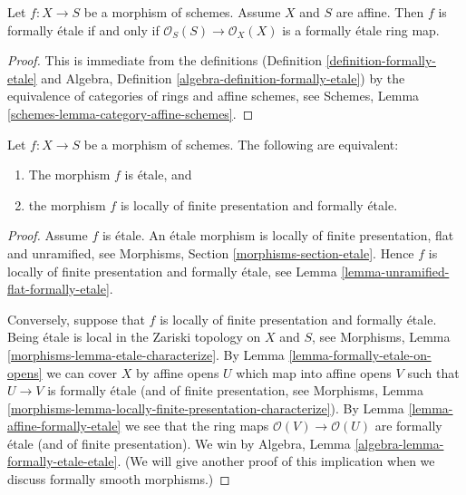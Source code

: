 \begin{lemma}
\label{lemma-affine-formally-etale}
Let $f : X \to S$ be a morphism of schemes.
Assume $X$ and $S$ are affine.
Then $f$ is formally \'etale if and only if
$\mathcal{O}_S(S) \to \mathcal{O}_X(X)$ is a formally \'etale
ring map.
\end{lemma}

\begin{proof}
This is immediate from the definitions
(Definition \ref{definition-formally-etale} and
Algebra, Definition \ref{algebra-definition-formally-etale})
by the equivalence of categories of rings and affine schemes,
see
Schemes, Lemma \ref{schemes-lemma-category-affine-schemes}.
\end{proof}

\begin{lemma}
\label{lemma-etale-formally-etale}
Let $f : X \to S$ be a morphism of schemes.
The following are equivalent:
\begin{enumerate}
\item The morphism $f$ is \'etale, and
\item the morphism $f$ is locally of finite presentation and
formally \'etale.
\end{enumerate}
\end{lemma}

\begin{proof}
Assume $f$ is \'etale.
An \'etale morphism is locally of finite presentation, flat and unramified, see
Morphisms, Section \ref{morphisms-section-etale}.
Hence $f$ is locally of finite presentation and formally \'etale, see
Lemma \ref{lemma-unramified-flat-formally-etale}.

\medskip\noindent
Conversely, suppose that $f$ is locally of finite presentation and
formally \'etale. Being \'etale is local in the Zariski topology on
$X$ and $S$, see
Morphisms, Lemma \ref{morphisms-lemma-etale-characterize}.
By
Lemma \ref{lemma-formally-etale-on-opens}
we can cover $X$ by affine opens $U$ which map into affine opens
$V$ such that $U \to V$ is formally \'etale (and of finite presentation, see
Morphisms,
Lemma \ref{morphisms-lemma-locally-finite-presentation-characterize}).
By
Lemma \ref{lemma-affine-formally-etale}
we see that the ring maps $\mathcal{O}(V) \to \mathcal{O}(U)$ are
formally \'etale (and of finite presentation).
We win by
Algebra, Lemma \ref{algebra-lemma-formally-etale-etale}.
(We will give another proof of this implication when we discuss
formally smooth morphisms.)
\end{proof}













